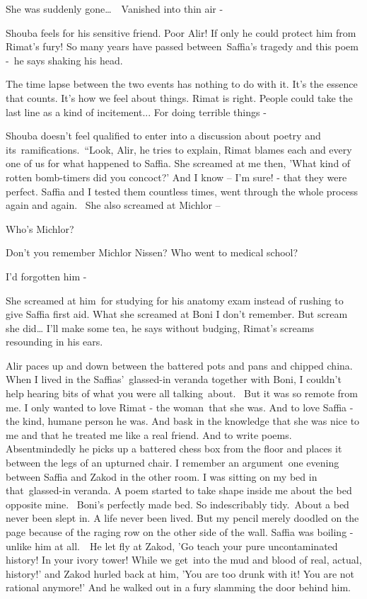 \documentclass[twoside,11pt]{book}
\begin{document}
{\textquotedbl}She was suddenly gone{\dots}\ \ Vanished into thin air -{\textquotedbl}

Shouba feels for his sensitive friend. Poor Alir! If only he could protect him from Rimat's fury! {\textquotedbl}So many
years have passed between~Saffia's tragedy and this poem -{\textquotedbl}\ he says shaking his head. 

{\textquotedbl}The time lapse between the two events has nothing to do with it. It's the essence that counts. It's how
we feel about things. Rimat is right. People could take the last line as a kind of incitement... For doing terrible
things -{\textquotedbl} 

Shouba doesn't feel qualified to enter into a discussion about poetry and its{\ }ramifications.\  ``Look,
Alir,{\textquotedbl} he tries to explain, {\textquotedbl}Rimat blames each and every one of us for what happened to
Saffia. She screamed at me then, 'What kind of rotten bomb-timers did you concoct?' And I know -- I'm sure! - that they
were perfect. Saffia and I tested them countless times, went through the whole process again and again. ~She also
screamed at Michlor --{\textquotedbl} 

{\textquotedbl}Who's Michlor?{\textquotedbl} 

{\textquotedbl}Don't you remember Michlor Nissen? Who went to medical school?{\textquotedbl} 

{\textquotedbl}I'd forgotten him -{\textquotedbl} 

{\textquotedbl}She screamed at him~for studying for his anatomy exam instead of rushing to give Saffia first aid. What
she screamed at Boni I don't remember. But scream she did{\dots} I'll make some tea,{\textquotedbl} he says without
budging, Rimat's screams resounding in his ears. 

Alir paces up and down between the battered pots and pans and chipped china. {\textquotedbl}When I lived in the
Saffias'\ glassed-in veranda together with Boni, I couldn't help hearing bits of what you were all talking~about.~ But
it was so remote from me. I only wanted to love Rimat - the woman\ that she was. And to love Saffia - the kind, humane
person he was. And bask in the knowledge that she was nice to me and that he treated me like a real friend. And to
write poems.{\textquotedbl} Absentmindedly he picks up a battered chess box from the floor and places it between the
legs of an upturned chair. {\textquotedbl}I remember an argument~one evening between Saffia and Zakod in the other
room. I was sitting on my bed in that\ glassed-in veranda. A poem started to take shape inside me about the bed
opposite mine.~ Boni's perfectly made bed. So indescribably tidy.\ About a bed never been slept in. A life never been
lived. But my pencil merely doodled on the page because of the raging row on the other side of the wall. Saffia was
boiling - unlike him at all.\ \ He let fly at Zakod, 'Go teach your pure uncontaminated history! In your ivory tower!
While we get~into the mud and blood of real, actual, history!' and Zakod hurled back at him, 'You are too drunk with
it! You are not rational anymore!{}' And he walked out in a fury slamming the door behind him.{\textquotedbl}\ 
\end{document}
